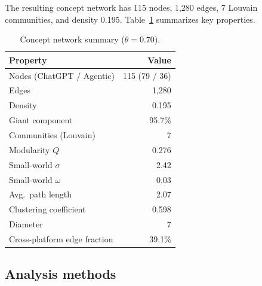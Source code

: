 \documentclass[11pt,twocolumn]{article}
\begin{document}
The resulting concept network has 115 nodes, 1,280 edges, 7 Louvain communities, and density 0.195.
Table~\ref{tab:network_summary} summarizes key properties.

\begin{table}[t]
  \centering
  \caption{Concept network summary ($\theta = 0.70$).}
  \label{tab:network_summary}
  \begin{tabular}{lr}
    \toprule
    Property & Value \\
    \midrule
    Nodes (ChatGPT / Agentic) & 115 (79 / 36) \\
    Edges & 1,280 \\
    Density & 0.195 \\
    Giant component & 95.7\% \\
    Communities (Louvain) & 7 \\
    Modularity $Q$ & 0.276 \\
    Small-world $\sigma$ & 2.42 \\
    Small-world $\omega$ & 0.03 \\
    Avg.\ path length & 2.07 \\
    Clustering coefficient & 0.598 \\
    Diameter & 7 \\
    Cross-platform edge fraction & 39.1\% \\
    \bottomrule
  \end{tabular}
\end{table}

\subsection{Analysis methods}
\end{document}
